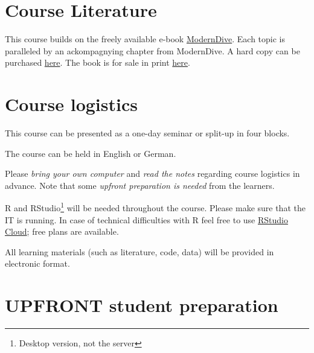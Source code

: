 \documentclass[
  letterpaper,
  DIV=11,
  numbers=noendperiod]{scrreprt}
\theoremstyle{definition}
\theoremstyle{definition}
\theoremstyle{remark}
\begin{document}
\hypertarget{course-literature}{%
\section*{Course Literature}\label{course-literature}}

This course builds on the freely available e-book
\href{https://moderndive.com/index.html}{ModernDive}. Each topic is
paralleled by an ackompagnying chapter from ModernDive. A hard copy can
be purchased \href{https://moderndive.com/index.html}{here}. The book is
for sale in print
\href{https://www.routledge.com/Statistical-Inference-via-Data-Science-A-ModernDive-into-R-and-the-Tidyverse/Ismay-Kim/p/book/9780367409821?utm_source=crcpress.com\&utm_medium=referral}{here}.

\hypertarget{course-logistics}{%
\section*{Course logistics}\label{course-logistics}}

This course can be presented as a one-day seminar or split-up in four
blocks.

The course can be held in English or German.

Please \emph{bring your own computer} and \emph{read the notes}
regarding course logistics in advance. Note that some \emph{upfront
preparation is needed} from the learners.

R and RStudio\footnote{Desktop version, not the server} will be needed
throughout the course. Please make sure that the IT is running. In case
of technical difficulties with R feel free to use
\href{https://rstudio.cloud/}{RStudio Cloud}; free plans are available.

All learning materials (such as literature, code, data) will be provided
in electronic format.

\hypertarget{upfront-student-preparation}{%
\section*{UPFRONT student
preparation}\label{upfront-student-preparation}}
\end{document}

